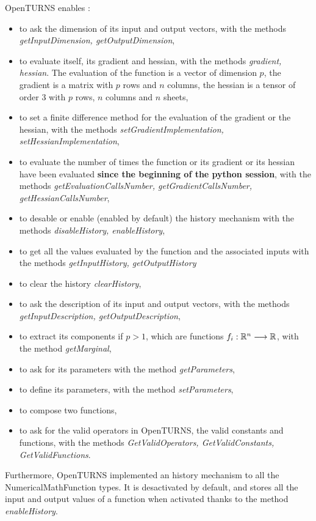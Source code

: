 OpenTURNS enables :
\begin{itemize}
\item to ask the dimension of its input and output vectors, with the methods {\itshape getInputDimension,  getOutputDimension},
\item to evaluate itself, its gradient and hessian, with the methods {\itshape gradient, hessian}. The evaluation of the function is a vector of dimension $p$, the gradient is a matrix with $p$ rows and $n$ columns, the hessian is a tensor of order 3 with  $p$ rows, $n$ columns and $n$ sheets,
\item to set a finite difference method for the evaluation of the gradient or the hessian, with the methods {\itshape setGradientImplementation, setHessianImplementation},
\item to evaluate the number of times the function or its gradient or its hessian have been evaluated {\bf since the beginning of the python session}, with the methods {\itshape getEvaluationCallsNumber, getGradientCallsNumber, getHessianCallsNumber},
\item to desable or enable (enabled by default) the history
  mechanism  with the methods   {\itshape disableHistory, enableHistory},
\item to get all the values evaluated by the function and the
  associated inputs with the methods
  {\itshape getInputHistory,  getOutputHistory}
\item to clear the history {\itshape clearHistory},
\item to ask the description of its input and output vectors, with the methods {\itshape getInputDescription,  getOutputDescription},
\item to extract its components if $p>1$, which are functions $f_i : {\mathbb R}^n  \longrightarrow {\mathbb R}$, with the method {\itshape getMarginal},
\item to ask for its parameters with the method {\itshape getParameters},
\item to define its parameters, with the method {\itshape setParameters},
\item to compose two functions,
\item to ask for the valid operators in OpenTURNS, the valid constants and functions, with the methods {\itshape GetValidOperators, GetValidConstants, GetValidFunctions}.
\end{itemize}

Furthermore,  OpenTURNS implemented an history mechanism to all the NumericalMathFunction types. It is desactivated by default, and stores all the input and output values of a function when activated thanks to the method  {\itshape enableHistory}.\\

